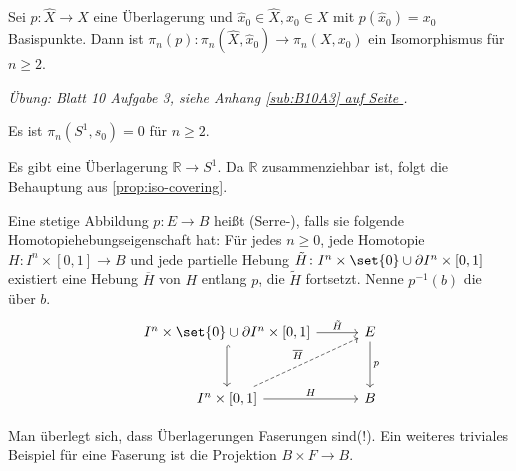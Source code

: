 \begin{proposition}[{name=[für $n\ge 2$ induzieren Überlagerungen Gruppenisomorphismen]},label=prop:iso-covering]
	Sei $p \colon \hat{X} \to X$ eine Überlagerung und $\hat{x}_0 \in \hat{X}, x_0 \in X$ mit $p(\hat{x}_0) = x_0$ Basispunkte. Dann ist $\pi_n(p) \colon \pi_n(\hat{X}, \hat{x}_0) \to \pi_n(X,x_0)$ ein Isomorphismus für $n \ge 2$.
\end{proposition}
\begin{beweis}
	\emph{Übung: Blatt 10 Aufgabe 3, siehe Anhang \hyperref[sub:B10A3]{\ref*{sub:B10A3} auf Seite \pageref*{sub:B10A3}}.}
\end{beweis}

\begin{korollar}[{name=[höhere Homotopiegruppen der 1-Sphäre]}]
	Es ist $\pi_n(S^1, s_0) = 0$ für $n \ge 2$.
\end{korollar}
\begin{beweis}
	Es gibt eine Überlagerung $\mathbb{R} \to S^1$. 
	Da $\mathbb{R}$ zusammenziehbar ist, folgt die Behauptung aus \cref{prop:iso-covering}.
\end{beweis}

\begin{definition}[{name=[Faserung]}]
	Eine stetige Abbildung $p \colon E \to B$ heißt (Serre-), falls sie folgende Homotopiehebungseigenschaft hat: 
	Für jedes $n \ge 0$, jede Homotopie $H \colon I^n \times [0,1] \to B$ und jede partielle Hebung $\tilde{H} \colon I^n \times \set{0} \cup \partial I^n \times [0,1]$ existiert eine Hebung $\overline{H}$ von $H$ entlang $p$, die $\tilde{H}$ fortsetzt. Nenne $p^{-1}(b)$ die  über $b$. 
	\[
		\begin{tikzcd}[row sep=3em, column sep=3em]
			I^n \times \set{0} \cup \partial I^n \times [0,1] \rar["\tilde{H}"]  \dar[hook]& E \dar["p"] \\
			I^n \times [0,1] \rar["H"] \urar[dashed,"\overline{H}"]& B
		\end{tikzcd}
	\]
\end{definition}

Man überlegt sich, dass Überlagerungen Faserungen sind(!).
Ein weiteres triviales Beispiel für eine Faserung ist die Projektion $B \times F \to B$.

